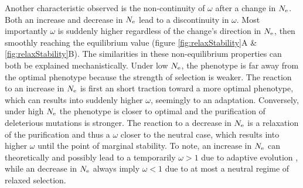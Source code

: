 \documentclass{MBE}%
\begin{document}
Another characteristic observed is the non-continuity of $\omega$ after a change in $N_{\mathrm{e}}$.
Both an increase and decrease in $N_{\mathrm{e}}$ lead to a discontinuity in $\omega$.
Most importantly $\omega$ is suddenly higher regardless of the change's direction in $N_{\mathrm{e}}$, then smoothly reaching the equilibrium value (figure \ref{fig:relaxStability}A \& \ref{fig:relaxStability}B).
The similarities in these non-equilibrium properties can both be explained mechanistically.
Under low $N_{\mathrm{e}}$, the phenotype is far away from the optimal phenotype because the strength of selection is weaker.
The reaction to an increase in $N_{\mathrm{e}}$ is first an short traction toward a more optimal phenotype, which can results into suddenly higher $\omega$, seemingly to an adaptation.
Conversely, under high $N_{\mathrm{e}}$ the phenotype is closer to optimal and the purification of deleterious mutations is stronger.
The reaction to a decrease in $N_{\mathrm{e}}$ is a relaxation of the purification and thus a $\omega$ closer to the neutral case, which results into higher $\omega$ until the point of marginal stability.
To note, an increase in $N_{\mathrm{e}}$ can theoretically and possibly lead to a temporarily $\omega > 1$ due to adaptive evolution \citep{Jones2016}, while an decrease in $N_{\mathrm{e}}$ always imply $\omega < 1$ due to at most a neutral regime of relaxed selection.
\end{document}
